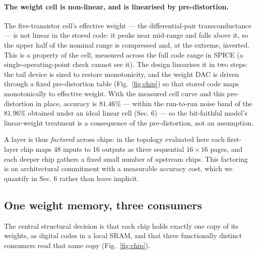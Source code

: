 \documentclass[11pt]{article}
\begin{document}
\hypertarget{the-weight-cell-is-non-linear-and-is-linearised-by-pre-distortion.}{%
\paragraph{The weight cell is non-linear, and is linearised by
pre-distortion.}\label{the-weight-cell-is-non-linear-and-is-linearised-by-pre-distortion.}}

The five-transistor cell's effective weight --- the differential-pair
transconductance --- is not linear in the stored code: it peaks near
mid-range and falls above it, so the upper half of the nominal range is
compressed and, at the extreme, inverted. This is a property of the
cell, measured across the full code range in SPICE (a
single-operating-point check cannot see it). The design linearises it in
two steps: the tail device is sized to restore monotonicity, and the
weight DAC is driven through a fixed pre-distortion table (Fig.~\ref{fig:chip}) so
that stored code maps monotonically to effective weight. With the
measured cell curve and this pre-distortion in place, accuracy is
\(81.46\%\) --- within the run-to-run noise band of the \(81.96\%\)
obtained under an ideal linear cell (Sec. 6) --- so the bit-faithful
model's linear-weight treatment is a consequence of the pre-distortion,
not an assumption.

A layer is thus \emph{factored} across chips: in the topology evaluated
here each first-layer chip maps 48 inputs to 16 outputs as three
sequential \(16\times16\) pages, and each deeper chip gathers a fixed
small number of upstream chips. This factoring is an architectural
commitment with a measurable accuracy cost, which we quantify in Sec. 6
rather than leave implicit.

\hypertarget{sec:three}{%
\subsection{One weight memory, three consumers}\label{sec:three}}

The central structural decision is that each chip holds exactly one copy
of its weights, as digital codes in a local SRAM, and that three
functionally distinct consumers read that same copy (Fig.~\ref{fig:chip}).
\end{document}
